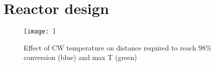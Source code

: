 \section*{Reactor design}
\begin{figure}[h]
    \centering
    \texttt{[image: ]}
    \caption{Effect of CW temperature on distance required to reach 98\% conversion (blue) and max T (green)}
    \label{fig:comsol-S4-CW-X-T}
\end{figure}